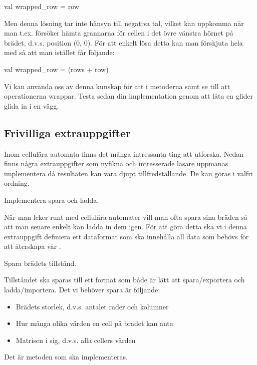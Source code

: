 \begin{Code}
val wrapped_row = row %
\end{Code}

Men denna lösning tar inte hänsyn till negativa tal, vilket kan uppkomma när man t.ex. försöker hämta grannarna för cellen i det övre vänstra hörnet på brädet, d.v.s. position (0, 0). För att enkelt lösa detta kan man förskjuta hela  med  så att man istället får följande:
		
\begin{Code}
val wrapped_row = (rows + row) %
\end{Code}

Vi kan använda oss av denna kunskap för att i metoderna  samt  se till att operationerna wrappar. Testa sedan din implementation genom att låta en glider glida in i en vägg.


\subsection{Frivilliga extrauppgifter}

Inom cellulära automata finns det många intressanta ting att utforska. Nedan finns några extrauppgifter som nyfikna och intresserade läsare uppmanas implementera då resultaten kan vara djupt tillfredställande. De kan göras i valfri ordning.


\Task Implementera spara och ladda.

När man leker runt med cellulära automater vill man ofta spara sina bräden så att man senare enkelt kan ladda in dem igen. För att göra detta ska vi i denna extrauppgift definiera ett dataformat som ska innehålla all data som behövs för att återskapa vår .

\Subtask Spara brädets tillstånd.

Tillståndet ska sparas till ett format som både är lätt att spara/exportera och ladda/importera. Det vi behöver spara är följande:

\begin{itemize}
	\item Brädets storlek, d.v.s. antalet rader och kolumner
	\item Hur många olika värden en cell på brädet kan anta
	\item Matrisen i sig, d.v.s. alla cellers värden
\end{itemize}
        	
Det är metoden  som ska implementeras.
        
